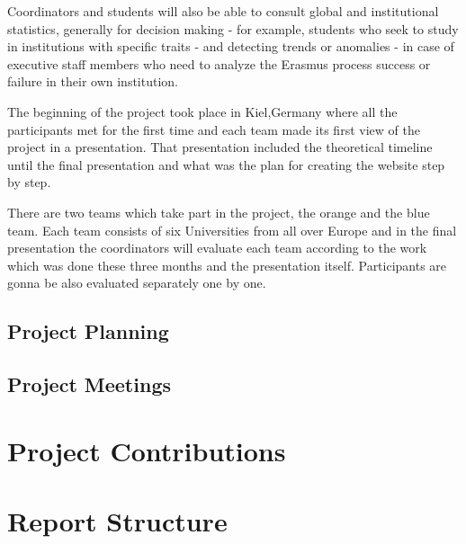 Coordinators and students will also be able to consult global and institutional
statistics, generally for decision making - for example, students who seek to
study in institutions with specific traits - and detecting trends or anomalies
- in case of executive staff members who need to analyze the Erasmus process
success or failure in their own institution.

The beginning of the project took place in Kiel,Germany where all the
participants met for the first time and each team made its first view of the
project in a presentation. That presentation included the theoretical timeline
until the final presentation and what was the plan for creating the website step
by step.

There are two teams which take part in the project, the orange and the blue
team. Each team consists of six Universities from all over Europe and in the
final presentation the coordinators will evaluate each team according to the
work which was done these three months and the presentation itself.
Participants are gonna be also evaluated separately one by one.

\subsection{Project Planning}

\subsection{Project Meetings}

\section{Project Contributions}

\section{Report Structure}